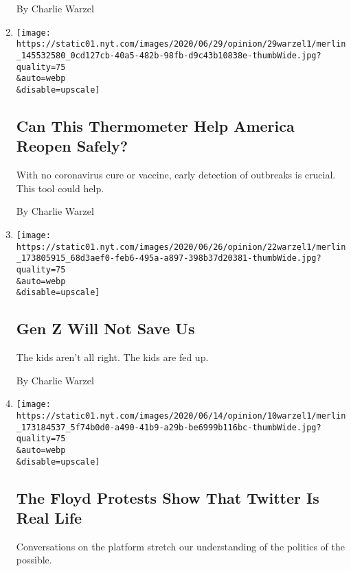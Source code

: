 \begin{enumerate}
  By Charlie Warzel
\item
  \href{/2020/06/29/opinion/coronavirus-kinsa-thermometer.html}{}

  \texttt{[image: https://static01.nyt.com/images/2020/06/29/opinion/29warzel1/merlin\_145532580\_0cd127cb-40a5-482b-98fb-d9c43b10838e-thumbWide.jpg?quality=75\\\&auto=webp\\\&disable=upscale]}

  \hypertarget{can-this-thermometer-help-america-reopen-safely}{%
  \subsection{Can This Thermometer Help America Reopen
  Safely?}\label{can-this-thermometer-help-america-reopen-safely}}

  With no coronavirus cure or vaccine, early detection of outbreaks is
  crucial. This tool could help.

  By Charlie Warzel
\item
  \href{/2020/06/22/opinion/trump-protest-gen-z.html}{}

  \texttt{[image: https://static01.nyt.com/images/2020/06/26/opinion/22warzel1/merlin\_173805915\_68d3aef0-feb6-495a-a897-398b37d20381-thumbWide.jpg?quality=75\\\&auto=webp\\\&disable=upscale]}

  \hypertarget{gen-z-will-not-save-us}{%
  \subsection{Gen Z Will Not Save Us}\label{gen-z-will-not-save-us}}

  The kids aren't all right. The kids are fed up.

  By Charlie Warzel
\item
  \href{/2020/06/10/opinion/sunday/twitter-protest-politics.html}{}

  \texttt{[image: https://static01.nyt.com/images/2020/06/14/opinion/10warzel1/merlin\_173184537\_5f74b0d0-a490-41b9-a29b-be6999b116bc-thumbWide.jpg?quality=75\\\&auto=webp\\\&disable=upscale]}

  \hypertarget{the-floyd-protests-show-that-twitter-is-real-life}{%
  \subsection{The Floyd Protests Show That Twitter Is Real
  Life}\label{the-floyd-protests-show-that-twitter-is-real-life}}

  Conversations on the platform stretch our understanding of the
  politics of the possible.


\end{enumerate}
